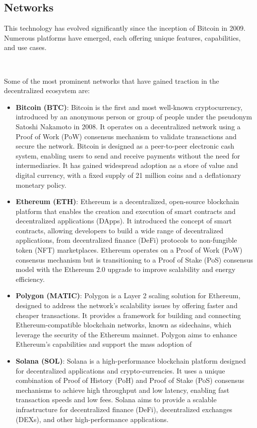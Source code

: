 \subsection{Networks}
\label{subsec:networks}

This technology has evolved significantly since the inception of Bitcoin in 2009. Numerous platforms have emerged, each offering unique features, capabilities, and use cases.

~

Some of the most prominent networks that have gained traction in the decentralized ecosystem are:
\begin{itemize}
    \item \textbf{Bitcoin (BTC)}: Bitcoin is the first and most well-known cryptocurrency, introduced by an anonymous person or group of people under the pseudonym Satoshi Nakamoto in 2008. It operates on a decentralized network using a Proof of Work (PoW) consensus mechanism to validate transactions and secure the network. Bitcoin is designed as a peer-to-peer electronic cash system, enabling users to send and receive payments without the need for intermediaries. It has gained widespread adoption as a store of value and digital currency, with a fixed supply of 21 million coins and a deflationary monetary policy.
    \item \textbf{Ethereum (ETH)}: Ethereum is a decentralized, open-source blockchain platform that enables the creation and execution of smart contracts and decentralized applications (DApps). It introduced the concept of smart contracts, allowing developers to build a wide range of decentralized applications, from decentralized finance (DeFi) protocols to non-fungible token (NFT) marketplaces. Ethereum operates on a Proof of Work (PoW) consensus mechanism but is transitioning to a Proof of Stake (PoS) consensus model with the Ethereum 2.0 upgrade to improve scalability and energy efficiency.
    \item \textbf{Polygon (MATIC)}: Polygon is a Layer 2 scaling solution for Ethereum, designed to address the network's scalability issues by offering faster and cheaper transactions. It provides a framework for building and connecting Ethereum-compatible blockchain networks, known as sidechains, which leverage the security of the Ethereum mainnet. Polygon aims to enhance Ethereum's capabilities and support the mass adoption of
    \item \textbf{Solana (SOL)}: Solana is a high-performance blockchain platform designed for decentralized applications and crypto-currencies. It uses a unique combination of Proof of History (PoH) and Proof of Stake (PoS) consensus mechanisms to achieve high throughput and low latency, enabling fast transaction speeds and low fees. Solana aims to provide a scalable infrastructure for decentralized finance (DeFi), decentralized exchanges (DEXs), and other high-performance applications.
\end{itemize}

